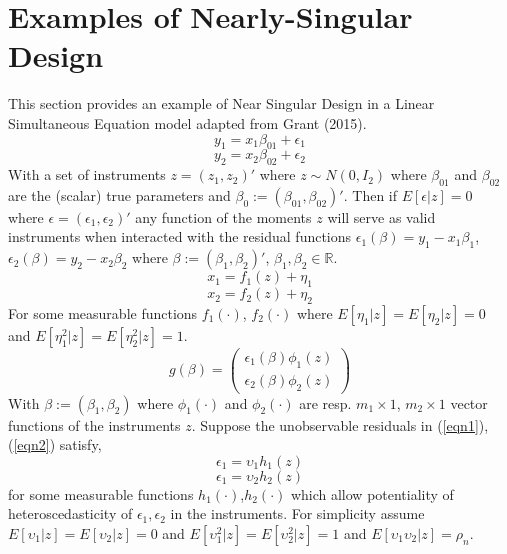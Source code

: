 \documentclass[11pt, fleqn]{article}
\begin{document}
\section{Examples of Nearly-Singular Design}

This section provides an example of Near Singular Design in a Linear Simultaneous Equation model adapted from Grant (2015).
\begin{equation} \label{eqn1} y_1=x_1\beta_{01}+\epsilon_1\end{equation}
\begin{equation}  \label{eqn2} y_2=x_2\beta_{02}+\epsilon_2\end{equation}
With a set of instruments $z=(z_1,z_2)'$ where $z\sim N(0,I_2)$ where $\beta_{01}$ and $\beta_{02} $ are the (scalar) true parameters and $\beta_0:=(\beta_{01},\beta_{02})'$. Then if $E[\epsilon|z]=0$ where $\epsilon=(\epsilon_1,\epsilon_2)'$ any function of the moments $z$ will serve as valid instruments when interacted with the residual functions $\epsilon_1(\beta)=y_1-x_1\beta_1$, $\epsilon_2(\beta)=y_2-x_2\beta_2$ where $\beta:=(\beta_1,\beta_2)'$, $\beta_1,\beta_2 \in \mathbb{R}$.
\begin{equation} x_1=f_1(z)+\eta_1\end{equation}
\begin{equation} x_2=f_2(z)+\eta_2\end{equation}
For some measurable functions $f_1(\cdot)$, $f_2(\cdot)$ where $E[\eta_1|z]=E[\eta_2|z]=0$ and $E[\eta_1^2|z]=E[\eta_2^2|z]=1$.
\begin{equation} g(\beta)=\left(\begin{array}{c} \epsilon_1(\beta)\phi_1(z) \\ \epsilon_2(\beta)\phi_2(z)\end{array} \right) \end{equation}
With $\beta:=(\beta_1,\beta_2)$ where $\phi_1(\cdot)$  and $\phi_2(\cdot)$  are resp. $m_1\times 1$, $m_2 \times 1$ vector functions of the instruments $z$. Suppose the unobservable residuals in (\ref{eqn1}), (\ref{eqn2})  satisfy,
\begin{equation}
\epsilon_1=\upsilon_1 h_1(z) \end{equation}
\begin{equation}
\epsilon_1=\upsilon_2 h_2(z) \end{equation}
for some measurable functions $h_1(\cdot)$,$h_2(\cdot)$ which allow  potentiality of  heteroscedasticity of $\epsilon_1,\epsilon_2$ in the instruments. For simplicity assume $E[\upsilon_1|z]=E[\upsilon_2|z]=0$ and $E[\upsilon_1^2|z]=E[\upsilon_2^2|z]=1$ and $E[\upsilon_1\upsilon_2|z]=\rho_n$.\\
\end{document}
